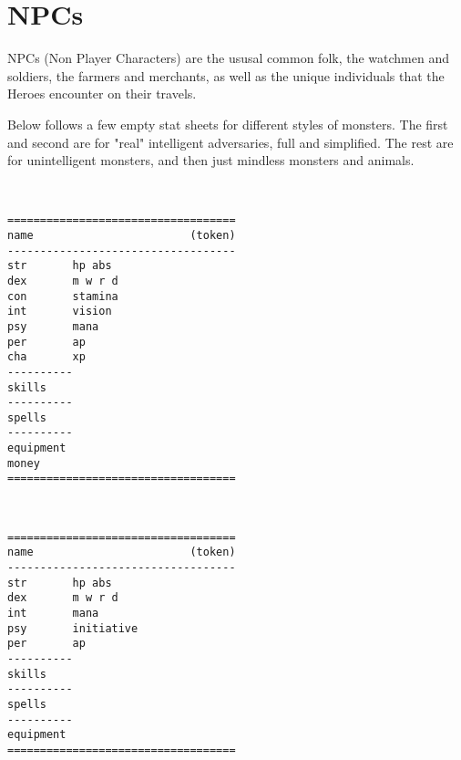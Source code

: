 

\raggedbottom






\chapter*{NPCs}

NPCs (Non Player Characters) are the ususal common folk, the watchmen and soldiers, the farmers and merchants, as well as the unique individuals that the Heroes encounter on their travels.

Below follows a few empty stat sheets for different styles of monsters. The first and second are for "real" intelligent adversaries, full and simplified. The rest are for unintelligent monsters, and then just mindless monsters and animals.

\

\goodbreak \begin{samepage} \small \begin{verbatim}
===================================
name                        (token)
-----------------------------------
str       hp abs
dex       m w r d
con       stamina
int       vision
psy       mana
per       ap
cha       xp
----------
skills
----------
spells
----------
equipment
money
===================================
\end{verbatim} \normalsize \end{samepage}

\

\goodbreak \begin{samepage} \small \begin{verbatim}
===================================
name                        (token)
-----------------------------------
str       hp abs
dex       m w r d
int       mana
psy       initiative
per       ap
----------
skills
----------
spells
----------
equipment
===================================
\end{verbatim} \normalsize \end{samepage}

